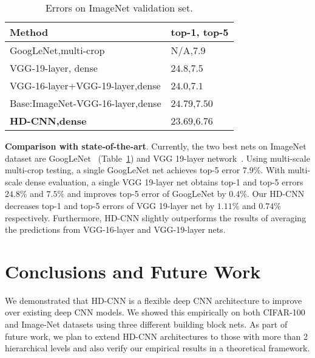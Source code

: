 \documentclass[10pt,twocolumn,letterpaper]{article}
\begin{document}
{\renewcommand{\arraystretch}{1.2}\begin{table}[h]
\vspace{-1.5em}
\caption{Errors on ImageNet validation set.}
\label{tab: imagenet_accuracy} 
\vspace{-1.5em}
\begin{center}
    \begin{tabular}{ p{5.7cm} |p{1.8cm}}
    Method & top-1, top-5 \\ 
    \hline \hline
    GoogLeNet,multi-crop~\cite{szegedy2014going} & N/A,$7.9$\\ \hline
    VGG-19-layer, dense~\cite{simonyan2014very} & $24.8$,$7.5$ \\ \hline 
VGG-16-layer+VGG-19-layer,dense & $24.0$,$7.1$ \\ \hline 
\hline
    Base:ImageNet-VGG-16-layer,dense & $24.79$,$7.50$ \\ \hline
    \textbf{HD-CNN,dense} &  $\mathbf{23.69}$,$\mathbf{6.76}$ \\ \hline   
    \end{tabular}   
\end{center}
\vspace{-1.5em}
\end{table}
}

\noindent \textbf{Comparison with state-of-the-art}. Currently, the two best nets on ImageNet dataset are GoogLeNet~\cite{szegedy2014going} (Table~\ref{tab: imagenet_accuracy}) and VGG 19-layer network~\cite{simonyan2014very}. Using multi-scale multi-crop testing, a single GoogLeNet net achieves top-5 error $7.9\%$.
With multi-scale dense evaluation, a single VGG 19-layer net obtains top-1 and top-5 errors $24.8\%$ and $7.5\%$ and improves top-5 error of GoogLeNet by $0.4\%$. Our HD-CNN decreases top-1 and top-5 errors of VGG 19-layer net by $1.11\%$ and $0.74\%$ respectively. Furthermore, HD-CNN slightly outperforms the results of averaging the predictions from
VGG-16-layer and VGG-19-layer nets.

\section{Conclusions and Future Work}
\label{ref:conclusion}
We demonstrated that HD-CNN is a flexible deep CNN architecture to improve over existing deep CNN models. We showed this empirically on both CIFAR-100 and Image-Net datasets using three different building block nets. As part of future work, we plan to extend HD-CNN architectures to those with more than 2 hierarchical levels and also verify our empirical results in a theoretical framework.








{\small


}
\end{document}
